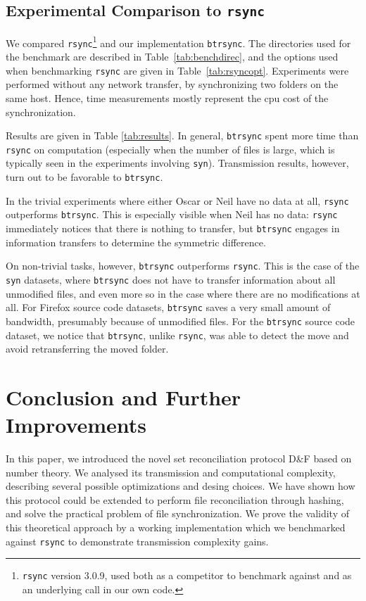 \documentclass{llncs}
\newcommand{\df}{D\&F\xspace}
\newcommand{\btrsync}{\texttt{btrsync}\xspace}
\newcommand{\rsync}{\texttt{rsync}\xspace}
\begin{document}
\subsection{Experimental Comparison to \rsync}

We compared \rsync\footnote{\rsync version 3.0.9, used both as a competitor to
benchmark against and as an underlying call in our own code.} and our implementation \btrsync. The directories used for the
benchmark are described in Table~\ref{tab:benchdirec}, and the options used
when benchmarking \rsync are given in Table~\ref{tab:rsyncopt}. Experiments
were performed without any network transfer, by synchronizing two folders on
the same host. Hence, time measurements mostly represent the {\sc cpu} cost of
the synchronization.

Results are given in Table \ref{tab:results}. In general, \btrsync spent more time than \rsync on computation (especially when the number of files is large, which is typically seen in the experiments involving {\tt syn}). Transmission results, however, turn out to be favorable to \btrsync.

In the trivial experiments where either Oscar or Neil have no data at all, \rsync outperforms \btrsync. This is especially visible when Neil has no data: \rsync immediately notices that there is nothing to transfer, but \btrsync engages in information transfers to determine the symmetric
difference.

On non-trivial tasks, however, \btrsync outperforms \rsync. This is the case of the {\tt syn} datasets, where \btrsync does not have to transfer
information about all unmodified files, and even more so in the case where there are no modifications at all. For Firefox source code datasets, \btrsync saves a very small amount of bandwidth, presumably because of unmodified files. For the \btrsync source code dataset, we notice that \btrsync, unlike \rsync, was able to detect the move and avoid retransferring the moved folder.


\section{Conclusion and Further Improvements}

In this paper, we introduced the novel set reconciliation protocol \df based on number theory. We analysed its transmission and computational complexity, describing several possible optimizations and desing choices. We have shown how this protocol could be extended to perform file reconciliation through hashing, and solve the practical problem of file synchronization. We prove the validity of this theoretical approach by a working implementation which we benchmarked against \rsync to demonstrate transmission complexity gains.
\end{document}
